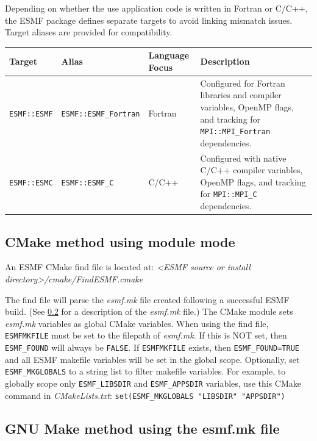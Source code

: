 Depending on whether the use application code is written in Fortran or C/C++, the ESMF package
defines separate targets to avoid linking mismatch issues. Target aliases are provided for
compatibility.

\vspace{1.5em}

\begin{table}[htbp]
\centering
\begin{tabular}{|l|l|l|l|}
\hline
\textbf{Target} & \textbf{Alias} & \textbf{Language Focus} & \textbf{Description} \\ \hline \hline
\texttt{ESMF::ESMF} & \texttt{ESMF::ESMF\_Fortran} & Fortran & \parbox[t]{6.5cm}{Configured for Fortran libraries and compiler variables, OpenMP flags, and tracking for \texttt{MPI::MPI\_Fortran} dependencies.} \\ \hline
\texttt{ESMF::ESMC} & \texttt{ESMF::ESMF\_C}       & C/C++   & \parbox[t]{6.5cm}{Configured with native C/C++ compiler variables, OpenMP flags, and tracking for \texttt{MPI::MPI\_C} dependencies.} \\ \hline
\end{tabular}
\end{table}


\subsection{CMake method using module mode}

An ESMF CMake find file is located at: \textit{<ESMF source or install directory>/cmake/FindESMF.cmake}

The find file will parse the \textit{esmf.mk} file created following a successful
ESMF build. (See \ref{sec:EsmfMkMethod} for a description of the \textit{esmf.mk} file.)
The CMake module sets \textit{esmf.mk} variables as global CMake variables. When
using the find file, {\tt ESMFMKFILE} must be set to the filepath of \textit{esmf.mk}.
If this is NOT set, then {\tt ESMF\_FOUND} will always be {\tt FALSE}. If {\tt ESMFMKFILE}
exists, then {\tt ESMF\_FOUND=TRUE} and all ESMF makefile variables will be set
in the global scope. Optionally, set {\tt ESMF\_MKGLOBALS} to a string list to
filter makefile variables. For example, to globally scope only {\tt ESMF\_LIBSDIR}
and {\tt ESMF\_APPSDIR} variables, use this CMake command in \textit{CMakeLists.txt}: \verb|set(ESMF_MKGLOBALS "LIBSDIR" "APPSDIR")|

\subsection{GNU Make method using the esmf.mk file}
\label{sec:EsmfMkMethod}

